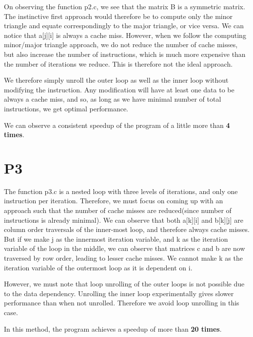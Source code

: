 \documentclass{article}
\begin{document}
On observing the function p2.c, we see that the matrix B is a symmetric matrix. The instinctive first approach would therefore be to compute only the minor triangle and equate correspondingly to the major triangle, or vice versa. We can notice that a[j][i] is always a cache miss. However, when we follow the computing minor/major triangle approach, we do not reduce the number of cache misses, but also increase the number of instructions, which is much more expensive than the number of iterations we reduce. This is therefore not the ideal approach. 

We therefore simply unroll the outer loop as well as the inner loop without modifying the instruction. Any modification will have at least one data to be always a cache miss, and so, as long as we have minimal number of total instructions, we get optimal performance.   

We can observe a consistent speedup of the program of a little more than \textbf{4 times}.

\section{P3}

The function p3.c is a nested loop with three levels of iterations, and only one instruction per iteration.
Therefore, we must focus on coming up with an approach such that the number of cache misses are reduced(since number of instructions is already minimal). We can observe that both a[k][i] and b[k][j] are column order traversals of the inner-most loop, and therefore always cache misses. But if we make j as the innermost iteration variable, and k as the iteration variable of the loop in the middle, we can observe that matrices c and b are now traversed by row order, leading to lesser cache misses. We cannot make k as the iteration variable of the outermost loop as it is dependent on i.

However, we must note that loop unrolling of the outer loops is not possible due to the data dependency. Unrolling the inner loop experimentally gives slower performance than when not unrolled. Therefore we avoid loop unrolling in this case. 

In this method, the program achieves a speedup of more than \textbf{20 times}.
\end{document}
